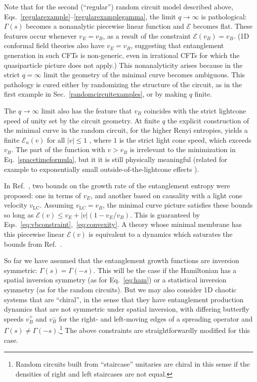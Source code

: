 \documentclass[aps,prx,twocolumn,superscriptaddress,floatfix,nofootinbib,prx]{revtex4}
\renewcommand{\>}{\right\rangle}
\newcommand{\<}{\left\langle}
\newcommand{\lt}{\mathcal{E}}
\begin{document}
Note that for the second (``regular'') random circuit model described above, Eqs.~\ref{regularexample}--\ref{regularexamplegamma}, the limit $q\rightarrow \infty$ is pathological: $\Gamma(s)$ becomes a nonanalytic piecewise linear function and $\lt$ becomes flat. 
 These features occur whenever $v_E=v_B$, as a result of the constraint $\lt(v_B) = v_B$. (1D conformal field theories also have $v_E=v_B$, suggesting that entanglement generation in such CFTs is non-generic, even in irrational CFTs for which the quasiparticle picture does not apply.)  This nonanalyticity arises because in the strict $q=\infty$ limit the geometry of the minimal curve becomes ambiguous.\cite{nahum} This pathology is cured either by randomizing the structure of the circuit, as in the first example in Sec.~\ref{randomcircuitexamples}, or by making $q$ finite. 
 
The $q\rightarrow \infty$ limit also has the feature that $v_B$ coincides with the strict lightcone speed of unity set by the circuit geometry. 
At finite $q$ the explicit construction of the minimal curve in the random circuit, for the higher Renyi entropies, yields a finite $\lt_n(v)$  for all $|v|\leq 1$ , where $1$ is the strict light cone speed, which exceeds $v_B$. The part of the function with $v>v_B$  is irrelevant to the minimization in Eq.~\ref{spacetimeformula}, but it it is still physically meaningful (related for example to exponentially small outside-of-the-lightcone effects \cite{zhounahum,lv}).

In Ref.~\cite{ms}, two bounds on the growth rate of the entanglement entropy were proposed: one in terms of $v_E$,  and another based on causality with a light cone velocity $v_\text{LC}$. 
Assuming ${v_\text{LC}=v_B}$,  the minimal curve picture satisfies these bounds so long as ${\lt(v)\leq v_E + |v| (1-v_E/v_B)}$. This is  guaranteed by 
Eqs.~\ref{eq:vbconstraint},~\ref{eq:convexity}.
A theory whose minimal membrane has this piecewise linear $\lt(v)$ is equivalent  to a dynamics which 
saturates the bounds from Ref.~\cite{ms}.
 
So far we have assumed that the entanglement growth functions are inversion symmetric:  $\Gamma(s)=\Gamma(-s)$. This will be the case if the Hamiltonian has a spatial inversion symmetry (as for Eq.~\ref{eq:ham}) or a statistical inversion symmetry (as for the random circuits). But we may also consider 1D chaotic systems that are ``chiral'', in the sense that they have entanglement production dynamics that are not symmetric under spatial inversion, with differing butterfly speeds $v_B^+$ and $v_B^-$ for the right- and left-moving edges of a spreading operator and $\Gamma(s)\neq \Gamma(-s)$.\footnote{Random circuits built from ``staircase'' unitaries  \cite{nahum2} are chiral in this sense if  the densities of right and left staircases are not equal.} The above constraints are straightforwardly modified for this case.
\end{document}
